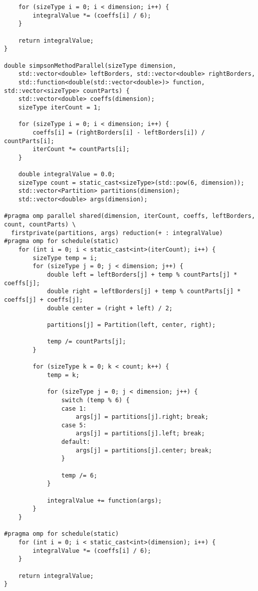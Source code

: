 \documentclass{report}
\begin{document}
\begin{lstlisting}
    for (sizeType i = 0; i < dimension; i++) {
        integralValue *= (coeffs[i] / 6);
    }

    return integralValue;
}

double simpsonMethodParallel(sizeType dimension,
    std::vector<double> leftBorders, std::vector<double> rightBorders,
    std::function<double(std::vector<double>)> function, std::vector<sizeType> countParts) {
    std::vector<double> coeffs(dimension);
    sizeType iterCount = 1;

    for (sizeType i = 0; i < dimension; i++) {
        coeffs[i] = (rightBorders[i] - leftBorders[i]) / countParts[i];
        iterCount *= countParts[i];
    }

    double integralValue = 0.0;
    sizeType count = static_cast<sizeType>(std::pow(6, dimension));
    std::vector<Partition> partitions(dimension);
    std::vector<double> args(dimension);

#pragma omp parallel shared(dimension, iterCount, coeffs, leftBorders, count, countParts) \
  firstprivate(partitions, args) reduction(+ : integralValue)
#pragma omp for schedule(static)
    for (int i = 0; i < static_cast<int>(iterCount); i++) {
        sizeType temp = i;
        for (sizeType j = 0; j < dimension; j++) {
            double left = leftBorders[j] + temp % countParts[j] * coeffs[j];
            double right = leftBorders[j] + temp % countParts[j] * coeffs[j] + coeffs[j];
            double center = (right + left) / 2;

            partitions[j] = Partition(left, center, right);

            temp /= countParts[j];
        }

        for (sizeType k = 0; k < count; k++) {
            temp = k;

            for (sizeType j = 0; j < dimension; j++) {
                switch (temp % 6) {
                case 1:
                    args[j] = partitions[j].right; break;
                case 5:
                    args[j] = partitions[j].left; break;
                default:
                    args[j] = partitions[j].center; break;
                }

                temp /= 6;
            }

            integralValue += function(args);
        }
    }

#pragma omp for schedule(static)
    for (int i = 0; i < static_cast<int>(dimension); i++) {
        integralValue *= (coeffs[i] / 6);
    }

    return integralValue;
}

\end{lstlisting}
\end{document}
